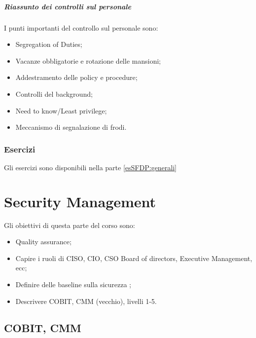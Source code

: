 \subsubsection{Riassunto dei controlli sul personale}

I punti importanti del controllo sul personale sono:
\begin{itemize}
\item Segregation of Duties;
\item Vacanze obbligatorie e rotazione delle mansioni;
\item Addestramento delle policy e procedure;
\item Controlli del background;
\item Need to know/Least privilege;
\item Meccanismo di segnalazione di frodi.
\end{itemize}

\section{Esercizi}

Gli esercizi sono disponibili nella parte \ref{esSFDP:generali}

\part{Security Management}
\label{SM}

Gli obiettivi di questa parte del corso sono:
\begin{itemize}
\item Quality assurance;
\item Capire i ruoli di CISO, CIO, CSO Board of directors, Executive
Management, ecc;
\item Definire delle baseline sulla sicurezza ;
\item Descrivere COBIT, CMM (vecchio), livelli 1-5.
\end{itemize}

\chapter{COBIT, CMM}

